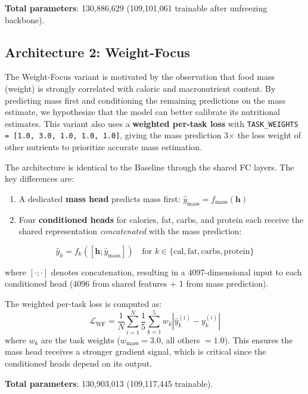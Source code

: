 \documentclass[11pt,a4paper]{article}
\begin{document}
\textbf{Total parameters}: 130,886,629 (109,101,061 trainable after unfreezing backbone).

\subsection{Architecture 2: Weight-Focus}

The Weight-Focus variant is motivated by the observation that food mass (weight) is strongly correlated with caloric and macronutrient content. By predicting mass first and conditioning the remaining predictions on the mass estimate, we hypothesize that the model can better calibrate its nutritional estimates. This variant also uses a \textbf{weighted per-task loss} with \texttt{TASK\_WEIGHTS = [1.0, 3.0, 1.0, 1.0, 1.0]}, giving the mass prediction 3$\times$ the loss weight of other nutrients to prioritize accurate mass estimation.

The architecture is identical to the Baseline through the shared FC layers. The key differences are:
\begin{enumerate}
  \item A dedicated \textbf{mass head} predicts mass first: $\hat{y}_{\text{mass}} = f_{\text{mass}}(\mathbf{h})$
  \item Four \textbf{conditioned heads} for calories, fat, carbs, and protein each receive the shared representation \emph{concatenated} with the mass prediction:
\end{enumerate}
\begin{equation}
  \hat{y}_k = f_k([\mathbf{h}; \hat{y}_{\text{mass}}]) \quad \text{for } k \in \{\text{cal}, \text{fat}, \text{carbs}, \text{protein}\}
\end{equation}

where $[\cdot;\cdot]$ denotes concatenation, resulting in a 4097-dimensional input to each conditioned head (4096 from shared features + 1 from mass prediction).

The weighted per-task loss is computed as:
\begin{equation}
  \mathcal{L}_{\text{WF}} = \frac{1}{N} \sum_{i=1}^{N} \frac{1}{5} \sum_{k=1}^{5} w_k \left| \hat{y}_k^{(i)} - y_k^{(i)} \right|
\end{equation}
where $w_k$ are the task weights ($w_{\text{mass}} = 3.0$, all others $= 1.0$). This ensures the mass head receives a stronger gradient signal, which is critical since the conditioned heads depend on its output.

\textbf{Total parameters}: 130,903,013 (109,117,445 trainable).
\end{document}

